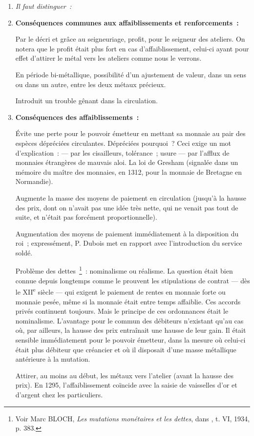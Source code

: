 \documentclass[french,twoside]{book} %
\newlength{\listmod}
\newcommand{\listhead}[1]{\hspace{-1\listmod}\emph{#1}}
\begin{document}
\begin{enumerate}[itemsep=\baselineskip,]
\item[]\listhead{Il faut distinguer :}
\item  \textbf{Conséquences communes aux affaiblissements et renforcements :}\par
 Par le décri et grâce au seigneuriage, profit, pour le seigneur des ateliers. On notera que le profit était plus fort en cas d’affaiblissement, celui-ci ayant pour effet d’attirer le métal vers les ateliers comme nous le verrons.\par
 En période bi-métallique, possibilité d’un ajustement de valeur, dans un sens ou dans un autre, entre les deux métaux précieux.\par
 Introduit un trouble gênant dans la circulation.  
\label{p93}
 
\item  \textbf{Conséquences des affaiblissements :}\par
 Évite une perte pour le pouvoir émetteur en mettant sa monnaie au pair des espèces dépréciées circulantes. Dépréciées pourquoi ? Ceci exige un mot d’explication : — par les cisailleurs, tolérance ; usure — par l’afflux de monnaies étrangères de mauvais aloi. La loi de Gresham (signalée dans un mémoire du maître des monnaies, en 1312, pour la monnaie de Bretagne en Normandie).\par
 Augmente la masse des moyens de paiement en circulation (jusqu’à la hausse des prix, dont on n’avait pas une idée très nette, qui ne venait pas tout de suite, et n’était pas forcément proportionnelle).\par
 Augmentation des moyens de paiement immédiatement à la disposition du roi ; expressément, P. Dubois met en rapport avec l’introduction du service soldé.\par
 Problème des dettes \footnote{ Voir Marc BLOCH, {\itshape Les mutations monétaires et les dettes}, dans \href{http://gallica.bnf.fr/document?O=N010027}{}, t. VI, 1934, p. 383.} : nominalisme ou réalisme. La question était bien connue depuis longtemps comme le prouvent les stipulations de contrat — dès le XII\textsuperscript{e} siècle — qui exigent le paiement de rentes en monnaie forte ou monnaie pesée, même si la monnaie était entre temps affaiblie. Ces accords privés continuent toujours. Mais le principe de ces ordonnances était le nominalisme. L’avantage pour le commun des débiteurs n’existant qu’au cas où, par ailleurs, la hausse des prix entraînait une hausse de leur gain. Il était sensible immédiatement pour le pouvoir émetteur, dans la mesure où celui-ci était plus débiteur que créancier et où il disposait d’une masse métallique antérieure à la mutation.\par
 Attirer, au moins au début, les métaux vers l’atelier (avant la hausse des prix). En 1295, l’affaiblissement coïncide avec la saisie de vaisselles d’or et d’argent chez les particuliers.
 

\end{enumerate}
\end{document}
